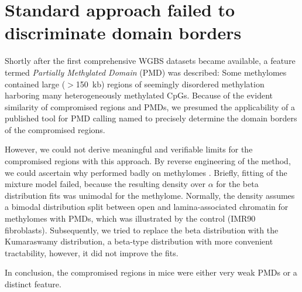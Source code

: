 \section{Standard approach failed to discriminate domain borders}
\label{chap:r:comprom:methylseeker} 

Shortly after the first comprehensive WGBS datasets became available, a feature termed \emph{Partially Methylated Domain} (PMD) was described\cite{Lister2009}: Some methylomes contained large ($>$\SI{150}{\kilo b}) regions of seemingly disordered methylation harboring many heterogeneously methylated CpGs. Because of the evident similarity of compromised regions and PMDs, we presumed the applicability of a published tool for PMD calling named \cite{Burger2013} to precisely determine the domain borders of the compromised regions. 

However, we could not derive meaningful and verifiable limits for the compromised regions with this approach. By reverse engineering of the method, we could ascertain why  performed badly on \dnmtchip methylomes \supple. Briefly, fitting of the mixture model failed, because the resulting density over $\alpha$ for the beta distribution fits was unimodal for the \dnmtchip methylome. Normally, the density assumes a bimodal distribution split between open and lamina-associated chromatin for methylomes with PMDs, which was illustrated by the control (IMR90 fibroblasts). Subsequently, we tried to replace the beta distribution with the Kumaraswamy distribution, a beta-type distribution with more convenient tractability\cite{Kumaraswamy1980,Jones2009}, however, it did not improve the fits. 

In conclusion, the compromised regions in \dnmtchip mice were either very weak PMDs or a distinct feature.     

